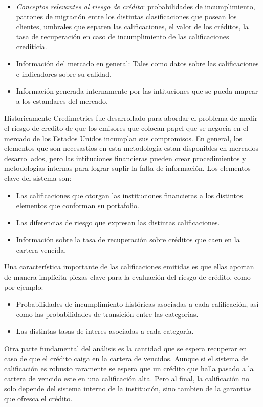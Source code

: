 \documentclass[
  12pt,
]{krantz}
\theoremstyle{definition}
\theoremstyle{definition}
\theoremstyle{definition}
\theoremstyle{remark}
\begin{document}
\begin{itemize}
\item
  \emph{Conceptos relevantes al riesgo de crédito}: probabilidades de incumplimiento, patrones de migración entre los distintas clasificaciones que posean los clientes, umbrales que separen las calificaciones, el valor de los créditos, la tasa de recuperación en caso de incumplimiento de las calificaciones crediticia.
\item
  Información del mercado en general: Tales como datos sobre las calificaciones e indicadores sobre su calidad.
\item
  Información generada internamente por las intituciones que se pueda mapear a los estandares del mercado.
\end{itemize}

Historicamente Credimetrics fue desarrollado para abordar el problema de medir el riesgo de credito de que los emisores que colocan papel que se negocia en el mercado de los Estados Unidos incumplan sus compromisos. En general, los elementos que son necesastios en esta metodología estan disponibles en mercados desarrollados, pero las intituciones financieras pueden crear procedimientos y metodologias internas para lograr suplir la falta de información. Los elementos clave del sistema son:

\begin{itemize}
\item
  Las calificaciones que otorgan las instituciones financieras a los distintos elementos que conforman su portafolio.
\item
  Las diferencias de riesgo que expresan las distintas calificaciones.
\item
  Información sobre la tasa de recuperación sobre créditos que caen en la cartera vencida.
\end{itemize}

Una característica importante de las calificaciones emitidas es que ellas aportan de manera implícita piezas clave para la evaluación del riesgo de crédito, como por ejemplo:

\begin{itemize}
\item
  Probabilidades de incumplimiento históricas asociadas a cada calificación, así como las probabilidades de transición entre las categorias.
\item
  Las distintas tasas de interes asociadas a cada categoría.
\end{itemize}

Otra parte fundamental del análisis es la cantidad que se espera recuperar en caso de que el crédito caiga en la cartera de vencidos. Aunque si el sistema de calificación es robusto raramente se espera que un crédito que halla pasado a la cartera de vencido este en una calificación alta. Pero al final, la calificación no solo depende del sistema interno de la institución, sino tambien de la garantias que ofresca el crédito.
\end{document}

